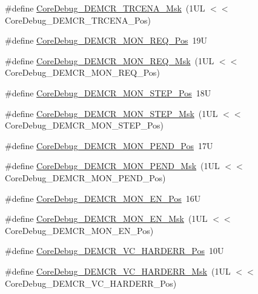 \begin{DoxyCompactItemize}
\#define \hyperlink{group___c_m_s_i_s___core_debug_ga5e99652c1df93b441257389f49407834}{Core\-Debug\-\_\-\-D\-E\-M\-C\-R\-\_\-\-T\-R\-C\-E\-N\-A\-\_\-\-Msk}~(1\-U\-L $<$$<$ Core\-Debug\-\_\-\-D\-E\-M\-C\-R\-\_\-\-T\-R\-C\-E\-N\-A\-\_\-\-Pos)
\item 
\#define \hyperlink{group___c_m_s_i_s___core_debug_ga341020a3b7450416d72544eaf8e57a64}{Core\-Debug\-\_\-\-D\-E\-M\-C\-R\-\_\-\-M\-O\-N\-\_\-\-R\-E\-Q\-\_\-\-Pos}~19\-U
\item 
\#define \hyperlink{group___c_m_s_i_s___core_debug_gae6384cbe8045051186d13ef9cdeace95}{Core\-Debug\-\_\-\-D\-E\-M\-C\-R\-\_\-\-M\-O\-N\-\_\-\-R\-E\-Q\-\_\-\-Msk}~(1\-U\-L $<$$<$ Core\-Debug\-\_\-\-D\-E\-M\-C\-R\-\_\-\-M\-O\-N\-\_\-\-R\-E\-Q\-\_\-\-Pos)
\item 
\#define \hyperlink{group___c_m_s_i_s___core_debug_ga9ae10710684e14a1a534e785ef390e1b}{Core\-Debug\-\_\-\-D\-E\-M\-C\-R\-\_\-\-M\-O\-N\-\_\-\-S\-T\-E\-P\-\_\-\-Pos}~18\-U
\item 
\#define \hyperlink{group___c_m_s_i_s___core_debug_ga2ded814556de96fc369de7ae9a7ceb98}{Core\-Debug\-\_\-\-D\-E\-M\-C\-R\-\_\-\-M\-O\-N\-\_\-\-S\-T\-E\-P\-\_\-\-Msk}~(1\-U\-L $<$$<$ Core\-Debug\-\_\-\-D\-E\-M\-C\-R\-\_\-\-M\-O\-N\-\_\-\-S\-T\-E\-P\-\_\-\-Pos)
\item 
\#define \hyperlink{group___c_m_s_i_s___core_debug_ga1e2f706a59e0d8131279af1c7e152f8d}{Core\-Debug\-\_\-\-D\-E\-M\-C\-R\-\_\-\-M\-O\-N\-\_\-\-P\-E\-N\-D\-\_\-\-Pos}~17\-U
\item 
\#define \hyperlink{group___c_m_s_i_s___core_debug_ga68ec55930269fab78e733dcfa32392f8}{Core\-Debug\-\_\-\-D\-E\-M\-C\-R\-\_\-\-M\-O\-N\-\_\-\-P\-E\-N\-D\-\_\-\-Msk}~(1\-U\-L $<$$<$ Core\-Debug\-\_\-\-D\-E\-M\-C\-R\-\_\-\-M\-O\-N\-\_\-\-P\-E\-N\-D\-\_\-\-Pos)
\item 
\#define \hyperlink{group___c_m_s_i_s___core_debug_ga802829678f6871863ae9ecf60a10425c}{Core\-Debug\-\_\-\-D\-E\-M\-C\-R\-\_\-\-M\-O\-N\-\_\-\-E\-N\-\_\-\-Pos}~16\-U
\item 
\#define \hyperlink{group___c_m_s_i_s___core_debug_gac2b46b9b65bf8d23027f255fc9641977}{Core\-Debug\-\_\-\-D\-E\-M\-C\-R\-\_\-\-M\-O\-N\-\_\-\-E\-N\-\_\-\-Msk}~(1\-U\-L $<$$<$ Core\-Debug\-\_\-\-D\-E\-M\-C\-R\-\_\-\-M\-O\-N\-\_\-\-E\-N\-\_\-\-Pos)
\item 
\#define \hyperlink{group___c_m_s_i_s___core_debug_gaed9f42053031a9a30cd8054623304c0a}{Core\-Debug\-\_\-\-D\-E\-M\-C\-R\-\_\-\-V\-C\-\_\-\-H\-A\-R\-D\-E\-R\-R\-\_\-\-Pos}~10\-U
\item 
\#define \hyperlink{group___c_m_s_i_s___core_debug_ga803fc98c5bb85f10f0347b23794847d1}{Core\-Debug\-\_\-\-D\-E\-M\-C\-R\-\_\-\-V\-C\-\_\-\-H\-A\-R\-D\-E\-R\-R\-\_\-\-Msk}~(1\-U\-L $<$$<$ Core\-Debug\-\_\-\-D\-E\-M\-C\-R\-\_\-\-V\-C\-\_\-\-H\-A\-R\-D\-E\-R\-R\-\_\-\-Pos)

\end{DoxyCompactItemize}
